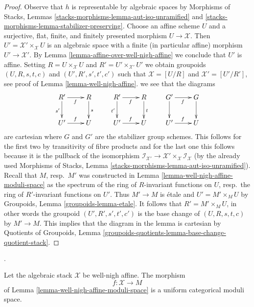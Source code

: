 \begin{proof}
Observe that $h$ is representable by algebraic spaces by
Morphisms of Stacks, Lemmas
\ref{stacks-morphisms-lemma-aut-iso-unramified} and
\ref{stacks-morphisms-lemma-stabilizer-preserving}.
Choose an affine scheme $U$ and a
surjective, flat, finite, and finitely presented morphism $U \to \mathcal{X}$.
Then $U' = \mathcal{X}' \times_\mathcal{X} U$ is an algebraic
space with a finite (in particular affine) morphism $U' \to \mathcal{X}'$.
By Lemma \ref{lemma-affine-over-well-nigh-affine}
we conclude that $U'$ is affine.
Setting $R = U \times_\mathcal{X} U$ and $R' = U' \times_{\mathcal{X}'} U'$
we obtain groupoids $(U, R, s, t, c)$ and $(U', R', s', t', c')$
such that $\mathcal{X} = [U/R]$ and $\mathcal{X}' = [U'/R']$,
see proof of Lemma \ref{lemma-well-nigh-affine}.
we see that the diagrams
$$
\xymatrix{
R' \ar[d]_{s'} \ar[r]_f & R \ar[d]^s \\
U' \ar[r]^f & U
}
\quad
\quad
\xymatrix{
R' \ar[d]_{t'} \ar[r]_f & R \ar[d]^t \\
U' \ar[r]^f & U
}
\quad
\quad
\xymatrix{
G' \ar[d] \ar[r]_f & G \ar[d] \\
U' \ar[r]^f & U
}
$$
are cartesian where $G$ and $G'$ are the stabilizer group schemes.
This follows for the first two by transitivity of fibre products
and for the last one this follows because it is the pullback of the
isomorphism $\mathcal{I}_{\mathcal{X}'} \to
\mathcal{X}' \times_\mathcal{X} \mathcal{I}_\mathcal{X}$
(by the already used Morphisms of Stacks, Lemma
\ref{stacks-morphisms-lemma-aut-iso-unramified}).
Recall that $M$, resp.\ $M'$ was constructed in
Lemma \ref{lemma-well-nigh-affine-moduli-space}
as the spectrum of the ring of $R$-invariant functions on $U$,
resp.\ the ring of $R'$-invariant functions on $U'$.
Thus $M' \to M$ is \'etale and $U' = M' \times_M U$
by Groupoids, Lemma \ref{groupoids-lemma-etale}.
It follows that $R' = M' \times_M U$, in other words
the groupoid $(U', R', s', t', c')$ is the base change of
$(U, R, s, t, c)$ by $M' \to M$.
This implies that the diagram in the lemma is
cartesian by
Quotients of Groupoids, Lemma
\ref{groupoids-quotients-lemma-base-change-quotient-stack}.
\end{proof}

\begin{lemma}
\label{lemma-moduli-space-finite-affine}
\begin{reference}
\cite[Expos\'e 212, Th\'eor\`eme 5.1 (iii), p. 111]{FGA}.
\end{reference}
Let the algebraic stack $\mathcal{X}$ be well-nigh affine. The morphism
$$
f : \mathcal{X} \longrightarrow M
$$
of Lemma \ref{lemma-well-nigh-affine-moduli-space}
is a uniform categorical moduli space.
\end{lemma}

